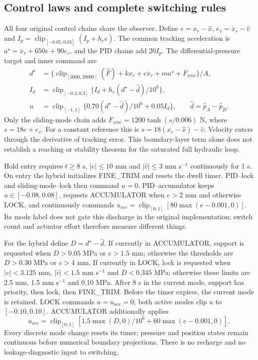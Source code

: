 \documentclass[machines,article,submit,pdftex,moreauthors]{Definitions/mdpi}
\begin{document}
\subsection{Control laws and complete switching rules}
All four original control chains share the observer. Define $e=x_r-\hat x$, $e_v=\dot x_r-\hat v$ and $I_p=\operatorname{clip}_{[-0.05,0.05]}(I_p+h_ce)$. The common tracking acceleration is $a^\star=\ddot x_r+650e+90e_v$, and the PID chains add $20I_p$. The differential-pressure target and inner command are
\begin{align}
d^\star&=\{\operatorname{clip}_{[3000,20000]}(\hat F)+kx_r+c\dot x_r+ma^\star+F_{smc}\}/A,\\
I_d&=\operatorname{clip}_{[-0.3,0.3]}\{I_d+h_c(d^\star-\hat d)/10^6\},\\
u&=\operatorname{clip}_{[-1,1]}\{0.70(d^\star-\hat d)/10^6+0.05I_d\},\qquad \hat d=\hat p_A-\hat p_B.
\label{eq:controller}
\end{align}
Only the sliding-mode chain adds $F_{smc}=1200\tanh(s/0.006)$ N, where $s=18e+e_v$. For a constant reference this is $s=18(x_r-\hat x)-\hat v$. Velocity enters through the derivative of tracking error. This boundary-layer term alone does not establish a reaching or stability theorem for the saturated full hydraulic loop.

Hold entry requires $t\ge8$ s, $|e|\le10$ mm and $|\hat v|\le3$ mm s$^{-1}$ continuously for 1 s. On entry the hybrid initializes FINE\_TRIM and resets the dwell timer. PID--lock and sliding-mode--lock then command $u=0$. PID--accumulator keeps $u\in[-0.08,0.08]$, requests ACCUMULATOR when $e>2$ mm and otherwise LOCK, and continuously commands $u_{acc}=\operatorname{clip}_{[0,1]}[80\max(e-0.001,0)]$. Its mode label does not gate this discharge in the original implementation; switch count and actuator effort therefore measure different things.

For the hybrid define $D=d^\star-\hat d$. If currently in ACCUMULATOR, support is requested when $D>0.05$ MPa or $e>1.5$ mm; otherwise the thresholds are $D>0.30$ MPa or $e>4$ mm. If currently in LOCK, lock is requested when $|e|<3.125$ mm, $|\hat v|<1.5$ mm s$^{-1}$ and $D<0.345$ MPa; otherwise these limits are 2.5 mm, 1.5 mm s$^{-1}$ and 0.10 MPa. After 8 s in the current mode, support has priority, then lock, then FINE\_TRIM. Before the timer expires, the current mode is retained. LOCK commands $u=u_{acc}=0$; both active modes clip $u$ to $[-0.10,0.10]$. ACCUMULATOR additionally applies
\begin{equation}
u_{acc}=\operatorname{clip}_{[0,1]}[1.5\max(D,0)/10^6+60\max(e-0.001,0)].
\label{eq:acc-command}
\end{equation}
Every discrete mode change resets its timer; pressure and position states remain continuous before numerical boundary projections. There is no recharge and no leakage-diagnostic input to switching.
\end{document}

